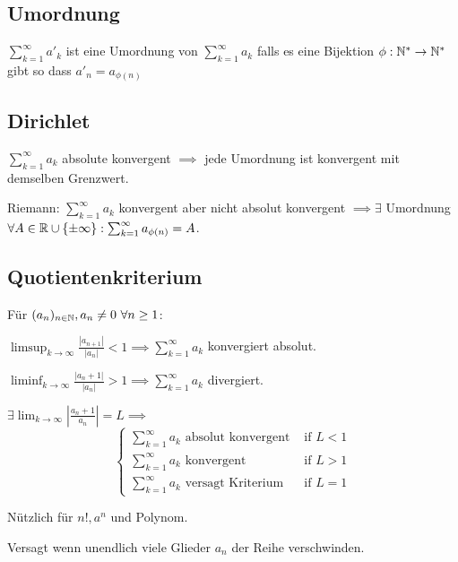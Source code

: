\subsection{Umordnung}
$\sum_{k=1}^{\infty} a'_k$ ist eine Umordnung von $\sum_{k=1}^{\infty} a_k$ falls es eine Bijektion $\phi : \mathbb{N}^* \to \mathbb{N}^*$ gibt so dass $a'_n = a_{\phi(n)}$

\subsection{Dirichlet}
$\sum_{k=1}^{\infty} a_k$ absolute konvergent $\implies$ jede Umordnung ist konvergent mit demselben Grenzwert.
\begin{compactdesc}
\item[Riemann:] $\sum_{k=1}^{\infty} a_k$ konvergent aber nicht absolut konvergent $\implies \exists $ Umordnung $\forall A \in \mathbb{R} \cup \{\pm \infty\}: \sum_{k=1}^{\infty} a_{\phi(n)} = A $.
\end{compactdesc}

\subsection{Quotientenkriterium}
Für $(a_n)_{n \in \mathbb{N}}, a_n \neq 0 \ \forall n \ge 1$:
\begin{compactenum}
    \item $\limsup_{k \to \infty} \frac{\left| a_{n+1} \right|}{\left| a_n \right| } < 1 \implies \sum_{k=1}^{\infty} a_k$ konvergiert absolut.
    \item $\liminf_{k \to \infty} \frac{\left| a_n + 1 \right|}{\left| a_n \right| } > 1 \implies \sum_{k=1}^{\infty} a_k$ divergiert.
\end{compactenum}
\begin{compactitem}
    \item $\exists \lim_{k \to \infty} \left| \frac{a_n + 1}{a_n} \right| =  L \implies$
        \[
        \begin{cases}
            \sum_{k=1}^{\infty} a_k \text{ absolut konvergent} & \text{ if } L < 1\\
            \sum_{k=1}^{\infty} a_k \text{ konvergent} & \text{ if } L > 1\\
            \sum_{k=1}^{\infty} a_k \text{ versagt Kriterium} & \text{ if } L = 1
        \end{cases}
        \] 
    \item Nützlich für $n!, a^n$ und Polynom.
    \item Versagt wenn unendlich viele Glieder $a_n$ der Reihe verschwinden.
\end{compactitem}

